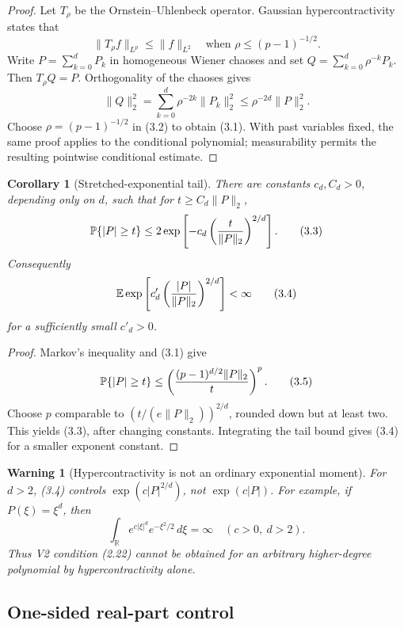 \documentclass[11pt]{article}
\newtheorem{corollary}[theorem]{Corollary}
\newtheorem{warning}[theorem]{Warning}
\theoremstyle{remark}
\begin{document}
\begin{proof}
Let \(T_\rho\) be the Ornstein--Uhlenbeck operator.  Gaussian
hypercontractivity states that
\[
                 \|T_\rho f\|_{L^p}\le\|f\|_{L^2}
                 \quad\text{when }\rho\le(p-1)^{-1/2}.       \tag{3.2}
\]
Write \(P=\sum_{k=0}^dP_k\) in homogeneous Wiener chaoses and set
\(Q=\sum_{k=0}^d\rho^{-k}P_k\).  Then \(T_\rho Q=P\).  Orthogonality
of the chaoses gives
\[
 \|Q\|_2^2
 =\sum_{k=0}^d\rho^{-2k}\|P_k\|_2^2
 \le\rho^{-2d}\|P\|_2^2.
\]
Choose \(\rho=(p-1)^{-1/2}\) in (3.2) to obtain (3.1).  With past
variables fixed, the same proof applies to the conditional polynomial;
measurability permits the resulting pointwise conditional estimate.
\end{proof}

\begin{corollary}[Stretched-exponential tail]
\label{cor:v12v3-tail}
There are constants \(c_d,C_d>0\), depending only on \(d\), such that
for \(t\ge C_d\|P\|_2\),
\[
 \mathbb P\{|P|\ge t\}
 \le2\exp\left[-c_d
       \left({t\over\|P\|_2}\right)^{2/d}\right].            \tag{3.3}
\]
Consequently
\[
 \mathbb E\exp\left[
 c'_d\left({|P|\over\|P\|_2}\right)^{2/d}\right]<\infty      \tag{3.4}
\]
for a sufficiently small \(c'_d>0\).
\end{corollary}

\begin{proof}
Markov's inequality and (3.1) give
\[
 \mathbb P\{|P|\ge t\}
 \le\left({(p-1)^{d/2}\|P\|_2\over t}\right)^p.             \tag{3.5}
\]
Choose \(p\) comparable to
\((t/(e\|P\|_2))^{2/d}\), rounded down but at least two.
This yields (3.3), after changing constants.  Integrating the tail
bound gives (3.4) for a smaller exponent constant.
\end{proof}

\begin{warning}[Hypercontractivity is not an ordinary exponential
moment]
\label{warn:v12v3-exponential}
For \(d>2\), (3.4) controls
\(\exp(c|P|^{2/d})\), not \(\exp(c|P|)\).
For example, if \(P(\xi)=\xi^d\), then
\[
 \int_{\mathbb R}e^{c|\xi|^d}e^{-\xi^2/2}\,d\xi=\infty
 \quad(c>0,\ d>2).                                          \tag{3.6}
\]
Thus V2 condition (2.22) cannot be obtained for an arbitrary
higher-degree polynomial by hypercontractivity alone.
\end{warning}

\subsection{One-sided real-part control}
\end{document}
